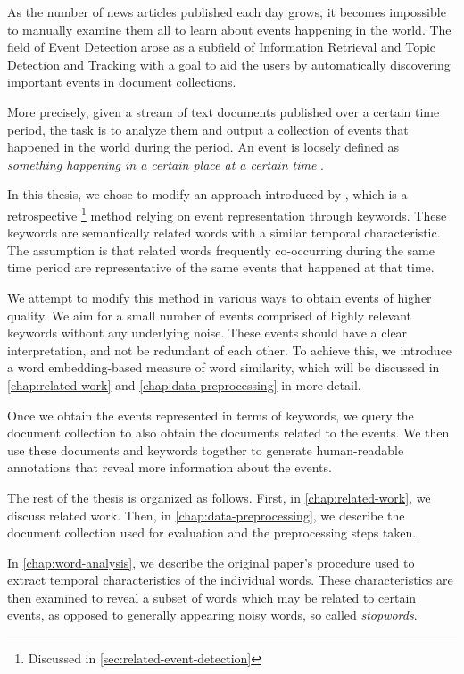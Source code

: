 As the number of news articles published each day grows, it becomes impossible to manually examine them all to learn about events happening in the world. The field of Event Detection arose as a subfield of Information Retrieval \citep{information-retrieval-2, information-retrieval} and Topic Detection and Tracking \citep{tdt, tdt-2} with a goal to aid the users by automatically discovering important events in document collections.

More precisely, given a stream of text documents published over a certain time period, the task is to analyze them and output a collection of events that happened in the world during the period. An event is loosely defined as \textit{something happening in a certain place at a certain time} \citep{retrospective-online-study}.

In this thesis, we chose to modify an approach introduced by \cite{event-detection}, which is a retrospective \footnote{Discussed in \autoref{sec:related-event-detection}} method relying on event representation through keywords. These keywords are semantically related words with a similar temporal characteristic. The assumption is that related words frequently co-occurring during the same time period are representative of the same events that happened at that time.

We attempt to modify this method in various ways to obtain events of higher quality. We aim for a small number of events comprised of highly relevant keywords without any underlying noise. These events should have a clear interpretation, and not be redundant of each other. To achieve this, we introduce a word embedding-based measure of word similarity, which will be discussed in \autoref{chap:related-work} and \autoref{chap:data-preprocessing} in more detail.

Once we obtain the events represented in terms of keywords, we query the document collection to also obtain the documents related to the events. We then use these documents and keywords together to generate human-readable annotations that reveal more information about the events.

The rest of the thesis is organized as follows. First, in \autoref{chap:related-work}, we discuss related work. Then, in \autoref{chap:data-preprocessing}, we describe the document collection used for evaluation and the preprocessing steps taken.

In \autoref{chap:word-analysis}, we describe the original paper's procedure used to extract temporal characteristics of the individual words. These characteristics are then examined to reveal a subset of words which may be related to certain events, as opposed to generally appearing noisy words, so called \textit{stopwords}.

